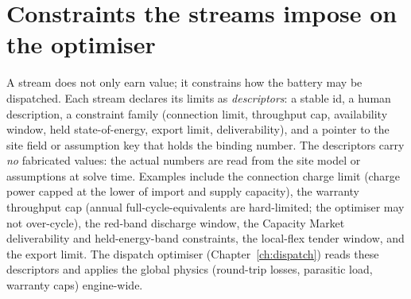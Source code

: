 \section{Constraints the streams impose on the optimiser}

A stream does not only earn value; it constrains how the battery may be dispatched. Each stream declares its limits as \emph{descriptors}: a stable id, a human description, a constraint family (connection limit, throughput cap, availability window, held state-of-energy, export limit, deliverability), and a pointer to the site field or assumption key that holds the binding number. The descriptors carry \emph{no} fabricated values: the actual numbers are read from the site model or assumptions at solve time. Examples include the connection charge limit (charge power capped at the lower of import and supply capacity), the warranty throughput cap (annual full-cycle-equivalents are hard-limited; the optimiser may not over-cycle), the red-band discharge window, the Capacity Market deliverability and held-energy-band constraints, the local-flex tender window, and the export limit. The dispatch optimiser (Chapter~\ref{ch:dispatch}) reads these descriptors and applies the global physics (round-trip losses, parasitic load, warranty caps) engine-wide.

